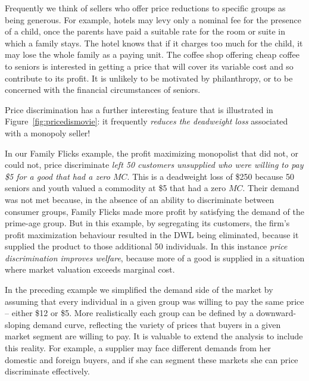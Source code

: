 Frequently we think of sellers who offer price reductions to specific groups as being generous. For example, hotels may levy only a nominal fee for the presence of a child, once the parents have paid a suitable rate for the room or suite in which a family stays. The hotel knows that if it charges too much for the child, it may lose the whole family as a paying unit. The coffee shop offering cheap coffee to seniors is interested in getting a price that will cover its variable cost and so contribute to its profit. It is unlikely to be motivated by philanthropy, or to be concerned with the financial circumstances of seniors.

Price discrimination has a further interesting feature that is illustrated in Figure~\ref{fig:pricedismovie}: it frequently \textit{reduces the deadweight loss} associated with a monopoly seller! 



In our Family Flicks example, the profit maximizing monopolist that did not, or could not, price discriminate \textit{left 50 customers unsupplied who were willing to pay \$5 for a good that had a zero $MC$}. This is a deadweight loss of \$250 because 50 seniors and youth valued a commodity at \$5 that had a zero $MC$. Their demand was not met because, in the absence of an ability to discriminate between consumer groups, Family Flicks made more profit by satisfying the demand of the prime-age group. But in this example, by segregating its customers, the firm's profit maximization behaviour resulted in the DWL being eliminated, because it supplied the product to those additional 50 individuals. In this instance \textit{price discrimination improves welfare}, because more of a good is supplied in a situation where market valuation exceeds marginal cost.

In the preceding example we simplified the demand side of the market by assuming that every individual in a given group was willing to pay the same price -- either \$12 or \$5. More realistically each group can be defined by a downward-sloping demand curve, reflecting the variety of prices that buyers in a given market segment are willing to pay. It is valuable to extend the analysis to include this reality. For example, a supplier may face different demands from her domestic and foreign buyers, and if she can segment these markets she can price discriminate effectively.

